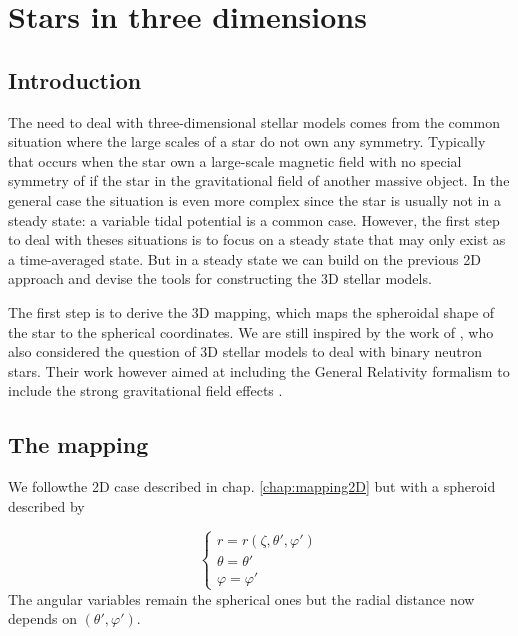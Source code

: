 \chapter{Stars in three dimensions}
\label{chap:3D}


\section{Introduction}

The need to deal with three-dimensional stellar models comes from the common
situation where the large scales of a star do not own any symmetry. Typically
that occurs when the star own a large-scale magnetic field with no special
symmetry of if the star  in the gravitational field of another massive object.
In the general case the situation is even more complex since the star is
usually not in a steady state: a variable tidal potential is a common case.
However, the first step to deal with theses situations is to focus on a steady
state that may only exist as a time-averaged state. But in a steady state we can
build on the previous 2D approach and devise the tools for constructing the 3D
stellar models.

The first step is to derive the 3D mapping, which maps the spheroidal shape of
the star to the spherical coordinates. We are still inspired by the work of
\cite{BGM98}, who also considered the question of 3D stellar models to deal with
binary neutron stars. Their work however aimed at including the General
Relativity formalism to include the strong gravitational field effects
\citep{BGM99}.

\section{The mapping}

We followthe 2D case described in chap. \ref{chap:mapping2D} but with a spheroid
described by

\begin{equation}
\left\{
\begin{array}{l}
r=r(\zeta,\theta',\varphi')\\
\theta=\theta'\\
\varphi=\varphi'
\end{array}
\right.
\label{themap3D}
\end{equation}
The angular variables remain the spherical ones but the radial distance now
depends on $(\theta',\varphi')$.
